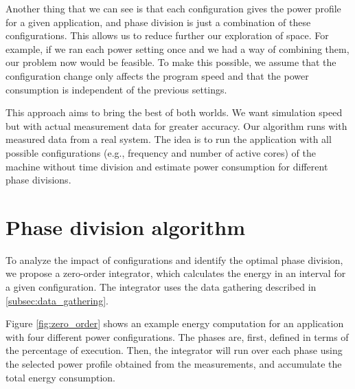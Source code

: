 Another thing that we can see is that each configuration gives the power profile for a given application, and phase division is just a combination of these configurations. This allows us to reduce further our exploration of space. For example, if we ran each power setting once and we had a way of combining them, our problem now would be feasible. To make this possible, we assume that the configuration change only affects the program speed and that the power consumption is independent of the previous settings.


This approach aims to bring the best of both worlds. We want simulation speed but with actual measurement data for greater accuracy. Our algorithm runs with measured data from a real system. The idea is to run the application with all possible configurations (e.g., frequency and number of active cores) of the machine without time division and estimate power consumption for different phase divisions.

\section{Phase division algorithm} \label{sec:phase_division_algorithm}
To analyze the impact of configurations and identify the optimal phase division, we propose a zero-order integrator, which calculates the energy in an interval for a given configuration. The integrator uses the data gathering described in \cref{subsec:data_gathering}.

Figure \ref{fig:zero_order} shows an example energy computation for an application with four different power configurations. The phases are, first, defined in terms of the percentage of execution. Then, the integrator will run over each phase using the selected power profile obtained from the measurements, and accumulate the total energy consumption.

